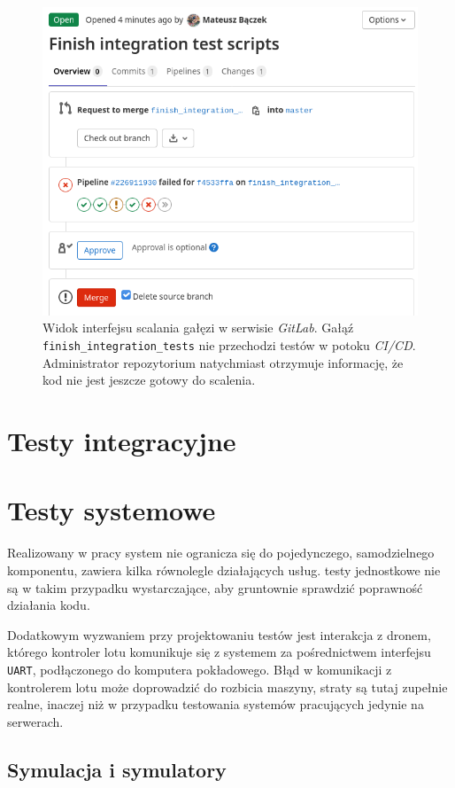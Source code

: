 \begin{figure}[H]
	\centering
	\includegraphics[width=0.8\linewidth]{rys05/failed_pipeline.png}
    \caption{
        Widok interfejsu scalania gałęzi w serwisie \textit{GitLab}.
        Gałąź \texttt{finish\_integration\_tests} nie przechodzi testów
        w potoku \textit{CI/CD}. Administrator repozytorium natychmiast
        otrzymuje informację, że kod nie jest jeszcze gotowy do scalenia.
    }
	\label{failed_pipeline}
\end{figure}


\section{Testy integracyjne}

\section{Testy systemowe}

Realizowany w pracy system nie ogranicza się do pojedynczego,
samodzielnego komponentu, zawiera kilka równolegle działających
usług. testy jednostkowe nie są w takim przypadku wystarczające,
aby gruntownie sprawdzić poprawność działania kodu. 

Dodatkowym wyzwaniem przy projektowaniu testów jest interakcja z dronem,
którego kontroler lotu komunikuje się z systemem za pośrednictwem 
interfejsu \texttt{UART}, podłączonego do komputera pokładowego.
Błąd w komunikacji z kontrolerem lotu może doprowadzić do 
rozbicia maszyny, straty są tutaj zupełnie realne, inaczej
niż w przypadku testowania systemów pracujących jedynie na serwerach. 

\subsection{
    Symulacja i symulatory
    \color{white}\cite{simulation_and_simulacra}}

